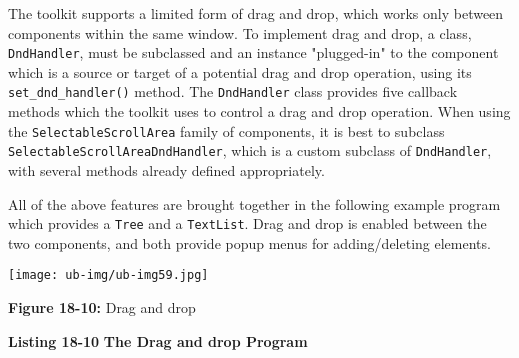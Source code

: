 The toolkit supports a limited form of drag and drop, which works only between
components within the same window.
To implement drag and drop, a class, \texttt{DndHandler}, must be
subclassed and an instance "plugged-in" to
the component which is a source or target of a potential drag and drop
operation, using its \texttt{set\_dnd\_handler()} method.
The \texttt{DndHandler} class provides five callback methods which the
toolkit uses to control a drag and drop operation.
When using the \texttt{SelectableScrollArea} family of components, it is
best to subclass \texttt{SelectableScrollAreaDndHandler}, which is a
custom subclass of \texttt{DndHandler}, with several methods already
defined appropriately.

All of the above features are brought together in the following example
program which provides a \texttt{Tree} and a \texttt{TextList}. Drag
and drop is enabled between the two components, and both provide popup
menus for adding/deleting elements.

\bigskip

\bigskip

\begin{center}
\texttt{[image: ub-img/ub-img59.jpg]}
\end{center}

{\sffamily\bfseries Figure 18-10:}
{\sffamily Drag and drop}

\bigskip

{\sffamily\bfseries Listing 18-10}
{\sffamily\bfseries The Drag and drop Program}

